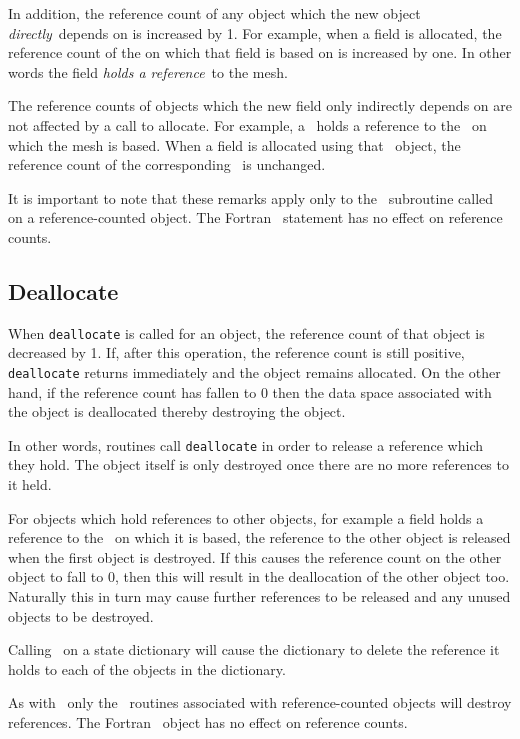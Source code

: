 \documentclass[a4paper, 11pt]{book}
\begin{document}
In addition, the reference count of any object which the new object
\emph{directly}\ depends on is increased by 1. For example, when a field is
allocated, the reference count of the \meshtype on which that field is based
on is increased by one. In other words the field \emph{holds a reference}\
to the mesh.

The reference counts of objects which the new field only indirectly depends
on are not affected by a call to allocate. For example, a \meshtype\ holds a
reference to the \elementtype\ on which the mesh is based. When a field is
allocated using that \meshtype\ object, the reference count of the
corresponding \elementtype\ is unchanged. 

It is important to note that these remarks apply only to the \allocate\
subroutine called on a reference-counted object. The Fortran \allocate\
statement has no effect on reference counts.

\subsection{Deallocate}\label{sec:deallocate}

When \lstinline+deallocate+ is called for an object, the reference count of
that object is decreased by 1. If, after this operation, the reference count
is still positive, \lstinline+deallocate+ returns immediately and the object
remains allocated. On the other hand, if the reference count has fallen to 0
then the data space associated with the object is deallocated thereby
destroying the object.

In other words, routines call \lstinline+deallocate+ in order to release a
reference which they hold. The object itself is only destroyed once there
are no more references to it held. 

For objects which hold references to other objects, for example a field
holds a reference to the \meshtype\ on which it is based, the reference to
the other object is released when the first object is destroyed. If this
causes the reference count on the other object to fall to 0, then this will
result in the deallocation of the other object too. Naturally this in turn
may cause further references to be released and any unused objects to be
destroyed.

Calling \deallocate\ on a state dictionary will cause the dictionary to
delete the reference it holds to each of the objects in the dictionary.

As with \allocate\ only the \deallocate\ routines associated with
reference-counted objects will destroy references. The Fortran \deallocate\
object has no effect on reference counts.
\end{document}
